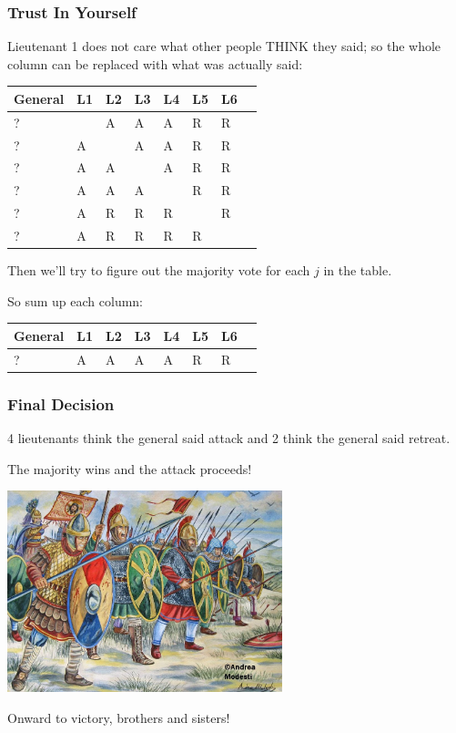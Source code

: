 \begin{frame}
	\frametitle{Trust In Yourself}

	Lieutenant 1 does not care what other people THINK they said; so the whole column can be replaced with what was actually said:

	\begin{center}
		\begin{tabular}{|l|l|l|l|l|l|l|l|}
			\hline
			General & L1 & L2 & L3 & L4 & L5 & L6 \\
			\hline
			?       & ~  & A  & A  & A  & R  & R  \\ \hline
			?       & A  & ~  & A  & A  & R  & R  \\ \hline
			?       & A  & A  & ~  & A  & R  & R  \\ \hline
			?       & A  & A  & A  & ~  & R  & R  \\ \hline
			?       & A  & R  & R  & R  & ~  & R  \\ \hline
			?       & A  & R  & R  & R  & R  & ~  \\ \hline
		\end{tabular}
	\end{center}

	Then we'll try to figure out the majority vote for each $j$ in the table.

	So sum up each column:

	\begin{center}
		\begin{tabular}{|l|l|l|l|l|l|l|l|}
			\hline
			General & L1 & L2 & L3 & L4 & L5 & L6 \\
			\hline
			?       & A  & A  & A  & A  & R  & R  \\
			\hline
		\end{tabular}
	\end{center}

\end{frame}


\begin{frame}
	\frametitle{Final Decision}
	4 lieutenants think the general said attack and 2 think the general said retreat.

	The majority wins and the attack proceeds!

	\begin{center}
		\includegraphics[width=0.6\textwidth]{images/byzantine-army.jpg}
	\end{center}

	Onward to victory, brothers and sisters!

\end{frame}


